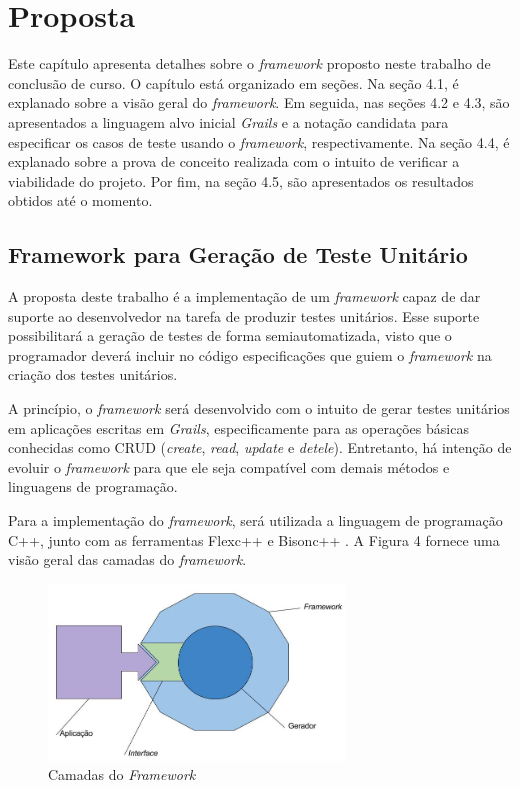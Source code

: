 \chapter[Proposta]{Proposta}
Este capítulo apresenta detalhes sobre o \textit{framework} proposto neste trabalho de conclusão de curso. O capítulo está organizado em seções. Na seção 4.1, é explanado sobre a visão geral do \textit{framework}. Em seguida, nas seções 4.2 e 4.3, são apresentados a linguagem alvo inicial \textit{Grails} e a notação candidata para especificar os casos de teste usando o \textit{framework}, respectivamente. Na seção 4.4, é explanado sobre a prova de conceito realizada com o intuito de verificar a viabilidade do projeto. Por fim, na seção 4.5,  são apresentados os resultados obtidos até o momento.

\section{Framework para Geração de Teste Unitário} \label{ch4sec1}

A proposta deste trabalho é a implementação de um \textit{framework} capaz de dar suporte ao desenvolvedor na tarefa de produzir testes unitários.  Esse suporte possibilitará a geração de testes de forma semiautomatizada, visto que o programador deverá incluir no código especificações que guiem o \textit{framework} na criação dos testes unitários. 
\par
\indent A princípio, o \textit{framework} será desenvolvido com o intuito de gerar testes unitários em aplicações escritas em \textit{Grails}, especificamente para as operações básicas conhecidas como CRUD (\textit{create}, \textit{read}, \textit{update} e \textit{detele}). Entretanto, há intenção de evoluir o \textit{framework} para que ele seja compatível com demais métodos e linguagens de programação. 
\par
\indent Para a implementação do \textit{framework}, será utilizada a linguagem de programação C++, junto com as ferramentas Flexc++ \cite{flexcpp2015} e Bisonc++ \cite{bisoncpp2015}. A Figura 4 fornece uma visão geral das camadas do \textit{framework}.
 
 \begin{figure}[h]
    \centering
    \includegraphics[width=0.7\textwidth]{figuras/estruturaarquitetural.jpg}
    \caption{Camadas do \textit{Framework}}
    \label{fig:estruturaarquitetural}
 \end{figure}

